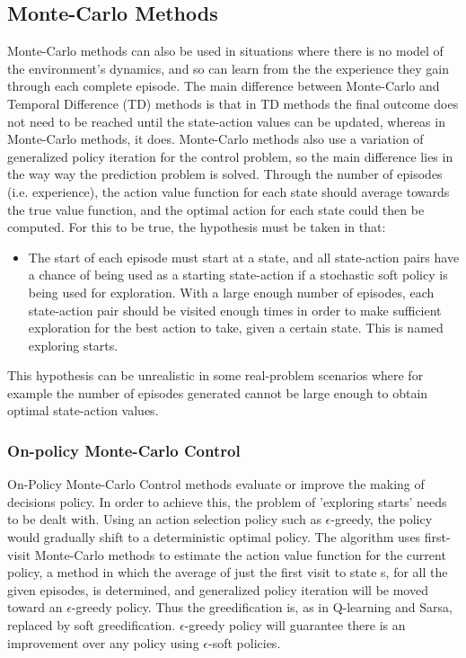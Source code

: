\documentclass[11pt]{article}
\begin{document}
\subsection{Monte-Carlo Methods}
Monte-Carlo methods can also be used in situations where there is no model of the environment's dynamics, and so can learn from the the experience they gain through each complete episode. The main difference between Monte-Carlo and Temporal Difference (TD) methods is that in TD methods the final outcome does not need to be reached until the state-action values can be updated, whereas in Monte-Carlo methods, it does. Monte-Carlo methods also use a variation of generalized policy iteration for the control problem, so the main difference lies in the way way the prediction problem is solved.
Through the number of episodes (i.e. experience), the action value function for each state should average towards the true value function, and the optimal action for each state could then be computed. For this to be true, the hypothesis must be taken in that:
\begin{itemize}
	\item The start of each episode must start at a state, and all state-action pairs have a chance of being used as a starting state-action if a stochastic soft policy is being used for exploration. With a large enough number of episodes, each state-action pair should be visited enough times in order to make sufficient exploration for the best action to take, given a certain state. This is named exploring starts.
\end{itemize}
This hypothesis can be unrealistic in some real-problem scenarios where for example the number of episodes generated cannot be large enough to obtain optimal state-action values.



\subsubsection{On-policy Monte-Carlo Control}
On-Policy Monte-Carlo Control methods evaluate or improve the making of decisions policy. In order to achieve this, the problem of 'exploring starts' needs to be dealt with. Using an action selection policy such as $\epsilon$-greedy, the policy would gradually shift to a deterministic optimal policy. The algorithm uses first-visit Monte-Carlo methods to estimate the action value function for the current policy, a method in which the average of just the first visit to state s, for all the given episodes, is determined, and generalized policy iteration will be moved toward an $\epsilon$-greedy policy. Thus the greedification is, as in Q-learning and Sarsa, replaced by soft greedification. $\epsilon$-greedy policy will guarantee there is an improvement over any policy using $\epsilon$-soft policies.
\end{document}
